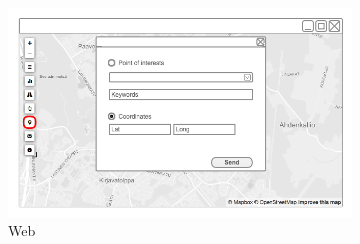 \begin{figure}[ht]
    \centering
    \begin{subfigure}[b]{0.6\textwidth}
        \includegraphics[width=\textwidth]
          {img/c02-application/png/web-basemap-focus.png}
        \caption{Web}
    \end{subfigure}
    ~
    \begin{subfigure}[b]{0.2\textwidth}

\end{subfigure}
\end{figure}
